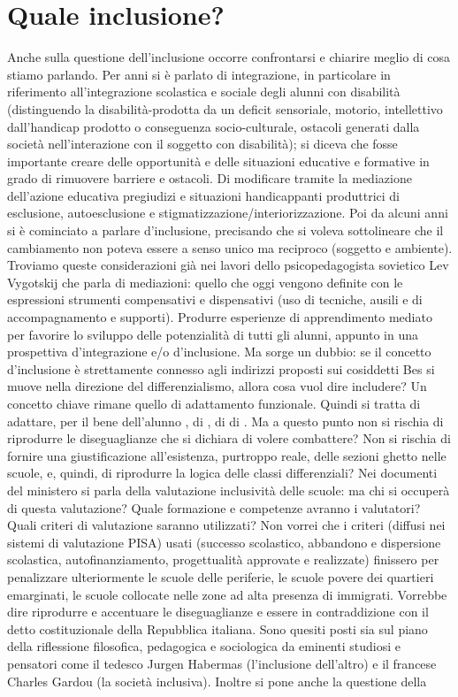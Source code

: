 \section*{ Quale inclusione?}
 
 Anche sulla questione dell'inclusione occorre confrontarsi e chiarire meglio di cosa stiamo parlando. Per anni si è parlato di integrazione, in particolare in riferimento all'integrazione scolastica e sociale degli alunni con disabilità (distinguendo la disabilità-prodotta da un deficit sensoriale, motorio, intellettivo dall'handicap prodotto o conseguenza socio-culturale, ostacoli generati dalla società nell'interazione con il soggetto con disabilità); si diceva che fosse importante creare delle opportunità e delle situazioni educative e formative in grado di rimuovere barriere e ostacoli. Di modificare tramite la mediazione dell'azione educativa pregiudizi e situazioni handicappanti produttrici di esclusione, autoesclusione e stigmatizzazione/interiorizzazione. Poi da alcuni anni si è cominciato a parlare d'inclusione, precisando che si voleva sottolineare che il cambiamento non poteva essere a senso unico ma reciproco (soggetto e ambiente). Troviamo queste considerazioni già nei lavori dello psicopedagogista sovietico Lev Vygotskij che parla di mediazioni: quello che oggi vengono definite con le espressioni strumenti compensativi e dispensativi (uso di tecniche, ausili e di accompagnamento e supporti). Produrre esperienze di apprendimento mediato per favorire lo sviluppo delle potenzialità di tutti gli alunni, appunto in una prospettiva d'integrazione e/o d'inclusione. Ma sorge un dubbio: se il concetto d'inclusione è strettamente connesso agli indirizzi proposti sui cosiddetti Bes si muove nella direzione del differenzialismo, allora cosa vuol dire includere? Un concetto chiave rimane quello di adattamento funzionale. Quindi si tratta di adattare, per il bene dell'alunno , di , di  di . Ma a questo punto non si rischia di riprodurre le diseguaglianze che si dichiara di volere combattere? Non si rischia di fornire una giustificazione  all'esistenza, purtroppo reale, delle sezioni ghetto nelle scuole, e, quindi, di riprodurre la logica delle classi differenziali? Nei documenti del ministero si parla della valutazione inclusività delle scuole: ma chi si occuperà di questa valutazione? Quale formazione e competenze avranno i valutatori? Quali criteri di valutazione saranno utilizzati? Non vorrei che i criteri (diffusi nei sistemi di valutazione PISA) usati (successo scolastico, abbandono e dispersione scolastica, autofinanziamento, progettualità approvate e realizzate) finissero per penalizzare ulteriormente le scuole delle periferie, le scuole povere dei quartieri emarginati, le scuole collocate nelle zone ad alta presenza di immigrati. Vorrebbe dire riprodurre e accentuare le diseguaglianze e essere in contraddizione con il detto costituzionale della Repubblica italiana. Sono quesiti posti sia sul piano della riflessione filosofica, pedagogica e sociologica da eminenti studiosi e pensatori come il tedesco Jurgen Habermas (l'inclusione dell'altro) e il francese Charles Gardou (la società inclusiva). Inoltre si pone anche la questione della 